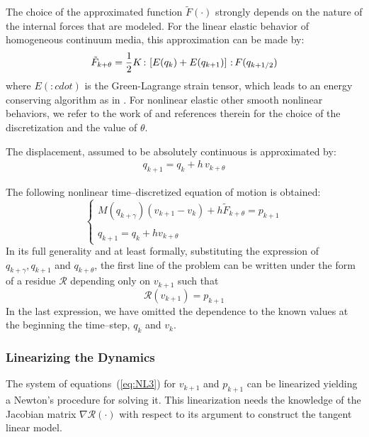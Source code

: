 \begin{remark} \label{eq:Simo}
  The choice of the approximated function $\tilde F(\cdot)$ strongly depends
  on the nature of the internal forces that are modeled. For the
  linear elastic behavior of homogeneous continuum media, this
  approximation can be made by:
\begin{equation}
\tilde F_{k+\theta} = \frac 1 2 K{\,:\,}\left[E(q_{k})+E(q_{k+1})\right] {\,:\,} F(q_{k+1/2})
\end{equation}
where $E(:cdot)$ is the Green-Lagrange strain tensor, which leads to an energy conserving algorithm as in
\citep{Simo.Tarnow92}. For nonlinear elastic other smooth nonlinear
behaviors, we refer to the work of
\citep{Gonzalez2000,Laursen.Meng2001} and references therein for the choice of the
discretization and the value of $\theta$.
\end{remark} 

The displacement, assumed to be absolutely continuous is approximated by:
\begin{eqnarray}
&  q_{k+1} = q_{k} +  h\,v_{k+\theta}  & \nonumber
\end{eqnarray}


The following nonlinear time--discretized equation of motion is obtained:
\begin{equation}
\label{eq:NSCD-discret-nl}
\begin{cases}
    M(q_{k+\gamma}) (v_{k+1}-v_{k}) + h \tilde F_{k+\theta} = p_{k+1} \\  \\
    q_{k+1} = q_{k} +  h v_{k+\theta}
\end{cases}
\end{equation}
In its full generality and at least formally, substituting the expression of $q_{k+\gamma},q_{k+1}$ and $q_{k+\theta}$,  the first line of the  problem can be written under the form of a residue $\mathcal R$ depending only on $v_{k+1}$ such that 
\begin{equation}
  \label{eq:NL3}
  \mathcal R (v_{k+1}) = p_{k+1}
\end{equation}
In the last expression, we have omitted the dependence to the known values at the beginning the time--step, \ie{} $q_k$ and $v_k$.

\subsubsection{Linearizing the Dynamics}

The system of equations~(\ref{eq:NL3}) for $v_{k+1}$ and $p_{k+1}$ can be linearized yielding a Newton's procedure  for solving it. This linearization needs the knowledge of the Jacobian matrix  $\nabla \mathcal R (\cdot)$ with respect to its argument to construct the tangent linear model.

